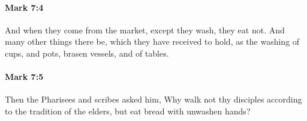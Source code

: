 		\paragraph{Mark 7:4} %
			\label{MARK-7-4}

			And when they come from the market, except they wash, they eat not. And many other things there be, which they have received to hold, as the washing of cups, and pots, brasen vessels, and of tables.

			\begin{framed}
			\scriptsize
				\begin{compactdesc}
					\item[SBLG] 
				\end{compactdesc}
			\end{framed}

		\paragraph{Mark 7:5} %
			\label{MARK-7-5}

			Then the Pharisees and scribes asked him, Why walk not thy disciples according to the tradition of the elders, but eat bread with unwashen hands?

